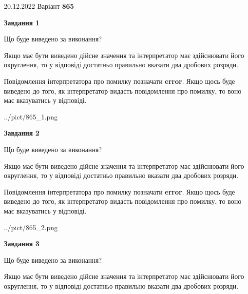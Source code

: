 \documentclass[12pt, ukrainian]{article}
\begin{document}
{20.12.2022 Варіант \No \textbf { 865 }\par}
{
\begin {Large}

{\begin {center}\textbf{Завдання 1}\end {center}}\par
Що буде виведено за виконання? \par

Якщо має бути виведено дійсне значення та інтерпретатор має здійснювати його округлення, 
то у відповіді достатньо правильно вказати два дробових розряди.

Повідомлення інтерпретатора про помилку позначати \textbf{error}.
Якщо щось буде виведено до того, як інтерпретатор видасть повідомлення про помилку, 
то воно має вказуватись у відповіді. \par

\begin{center}
	{../pict/865_1.png}
\end{center}
\newpage

{\begin {center}\textbf{Завдання 2}\end {center}}\par
Що буде виведено за виконання? \par

Якщо має бути виведено дійсне значення та інтерпретатор має здійснювати його округлення, 
то у відповіді достатньо правильно вказати два дробових розряди.

Повідомлення інтерпретатора про помилку позначати \textbf{error}.
Якщо щось буде виведено до того, як інтерпретатор видасть повідомлення про помилку, 
то воно має вказуватись у відповіді. \par

\begin{center}
	{../pict/865_2.png}
\end{center}
\newpage

{\begin {center}\textbf{Завдання 3}\end {center}}\par
Що буде виведено за виконання? \par

Якщо має бути виведено дійсне значення та інтерпретатор має здійснювати його округлення, 
то у відповіді достатньо правильно вказати два дробових розряди.


\end{Large}}
\end{document}
